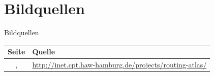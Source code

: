 \documentclass[ngerman,compress,hyperref={bookmarks}]{beamer}
\begin{document}
\section{Bildquellen}
\begin{frame}[plain]{Bildquellen}
  \scriptsize
  \begin{table}
    \begin{tabular}{ c p{} }
      Seite & Quelle \\ \hline
      \pageref{asgraphs}, \pageref{asngraphs2} & \url{http://inet.cpt.haw-hamburg.de/projects/routing-atlas/}\\ \hline
    \end{tabular}
  \end{table}
\end{frame}
\end{document}
